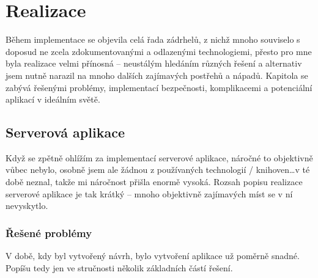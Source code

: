 
\chapter{Realizace}
Během implementace se objevila celá řada zádrhelů, z nichž mnoho souviselo s doposud ne zcela zdokumentovanými a odlazenými technologiemi, přesto pro mne byla realizace velmi přínosná -- neustálým hledáním různých řešení a alternativ jsem nutně narazil na mnoho dalších zajímavých postřehů a nápadů. Kapitola se zabývá řešenými problémy, implementací bezpečnosti, komplikacemi a potenciální aplikací v ideálním světě.

\section{Serverová aplikace}
Když se zpětně ohlížím za implementací serverové aplikace, náročné to objektivně vůbec nebylo, osobně jsem ale žádnou z používaných technologií / knihoven\dots v té době neznal, takže mi náročnost přišla enormě vysoká. Rozsah popisu realizace serverové aplikace je tak krátký -- mnoho objektivně zajímavých míst se v ní nevyskytlo.

\subsection{Řešené problémy}
V době, kdy byl vytvořený návrh, bylo vytvoření aplikace už poměrně snadné. Popíšu tedy jen ve stručnosti několik základních částí řešení.

